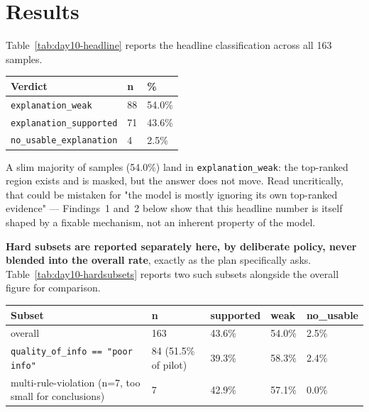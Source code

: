 \section{Results}

Table~\ref{tab:day10-headline} reports the headline classification across all 163 samples.

\begin{center}
\begin{tabular}{p{4.6cm}p{1.6cm}p{1.6cm}}
\toprule
\textbf{Verdict} & \textbf{n} & \textbf{\%} \\
\midrule
\texttt{explanation\_weak} & 88 & 54.0\% \\
\texttt{explanation\_supported} & 71 & 43.6\% \\
\texttt{no\_usable\_explanation} & 4 & 2.5\% \\
\bottomrule
\end{tabular}
\label{tab:day10-headline}
\end{center}

A slim majority of samples (54.0\%) land in \texttt{explanation\_weak}: the top-ranked region exists and
is masked, but the answer does not move. Read uncritically, that could be mistaken for "the model is
mostly ignoring its own top-ranked evidence" --- Findings~1 and~2 below show that this headline number
is itself shaped by a fixable mechanism, not an inherent property of the model.

\textbf{Hard subsets are reported separately here, by deliberate policy, never blended into the overall
rate}, exactly as the plan specifically asks. Table~\ref{tab:day10-hardsubsets} reports two such subsets
alongside the overall figure for comparison.

\begin{center}
\begin{tabular}{p{4.0cm}p{2.4cm}p{2.0cm}p{1.6cm}p{1.9cm}}
\toprule
\textbf{Subset} & \textbf{n} & \textbf{supported} & \textbf{weak} & \textbf{no\_\allowbreak usable} \\
\midrule
overall & 163 & 43.6\% & 54.0\% & 2.5\% \\
\texttt{quality\_of\_info == "poor info"} & 84 (51.5\% of pilot) & 39.3\% & 58.3\% & 2.4\% \\
multi-rule-violation (n=7, too small for conclusions) & 7 & 42.9\% & 57.1\% & 0.0\% \\
\bottomrule
\end{tabular}
\label{tab:day10-hardsubsets}
\end{center}


